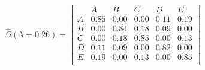 \documentclass{article}
\begin{document}
\begin{equation}
\hat \Omega (\lambda = 0.26) = \begin{bmatrix}
 & A & B & C & D & E \\ 
A & 0.85 & 0.00 & 0.00 & 0.11 & 0.19 \\ 
  B & 0.00 & 0.84 & 0.18 & 0.09 & 0.00 \\ 
  C & 0.00 & 0.18 & 0.85 & 0.00 & 0.13 \\ 
  D & 0.11 & 0.09 & 0.00 & 0.82 & 0.00 \\ 
  E & 0.19 & 0.00 & 0.13 & 0.00 & 0.85 \\ \end{bmatrix}
\end{equation}
\end{document}

